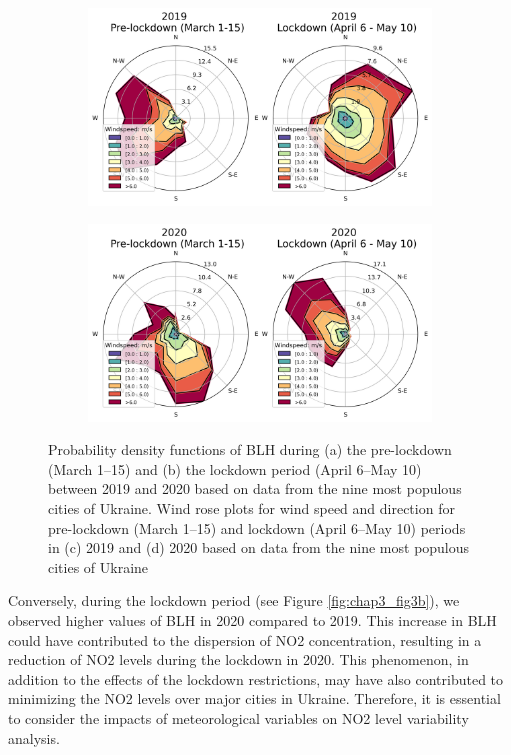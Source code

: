 \begin{figure}[tbh!]
\begin{subfigure}{.5\textwidth}
        \centering
        \includegraphics[width=\textwidth]{figs/chap3/fig4_a_2019.png}
        \caption{}
        \label{fig:chap3_fig4a}
    \end{subfigure}%
    \begin{subfigure}{.5\textwidth}
        \centering
        \includegraphics[width=\textwidth]{figs/chap3/fig4_b_2020.png}
        \caption{}
        \label{fig:chap3_fig4b}
    \end{subfigure}
    \caption[Meteorological variations during pre-lockdown and lockdown]{Probability density functions of BLH during (a) the pre-lockdown (March 1–15) and (b) the lockdown period (April 6–May 10) between 2019 and 2020 based on data from the nine most populous cities of Ukraine. Wind rose plots for wind speed and direction for pre-lockdown (March 1–15) and lockdown (April 6–May 10) periods in (c) 2019 and (d) 2020 based on data from the nine most populous cities of Ukraine}
    \label{fig:chap3_fig34}
\end{figure}

Conversely, during the lockdown period (see Figure \ref{fig:chap3_fig3b}), we observed higher values of BLH in 2020 compared to 2019. This increase in BLH could have contributed to the dispersion of NO2 concentration, resulting in a reduction of NO2 levels during the lockdown in 2020. This phenomenon, in addition to the effects of the lockdown restrictions, may have also contributed to minimizing the NO2 levels over major cities in Ukraine. Therefore, it is essential to consider the impacts of meteorological variables on NO2 level variability analysis.\par


